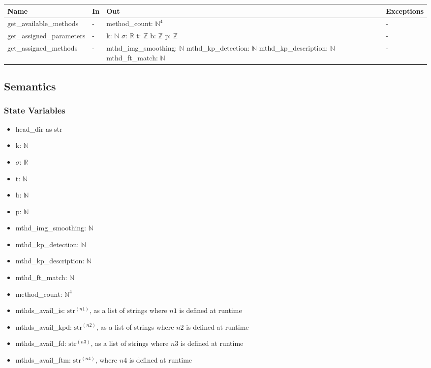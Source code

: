 \documentclass[12pt, titlepage]{article}
\begin{document}
\begin{center}
\begin{tabular}{p{4cm} p{3.5cm} p{4.5cm} p{3.5cm}}
\hline
\textbf{Name} & \textbf{In} & \textbf{Out} & \textbf{Exceptions} \\
\hline
get\_available\_methods & - & 
method\_count: $\mathbb{N}^4$
& - \\
\hline


get\_assigned\_parameters & - & 
k: $\mathbb{N}$ \newline 
$\sigma$: $\mathbb{R}$ \newline 
t: $\mathbb{Z}$ \newline 
b: $\mathbb{Z}$ \newline 
p: $\mathbb{Z}$ 
& - \\
\hline
\begin{comment}

\end{comment}
get\_assigned\_methods & - & 
mthd\_img\_smoothing: $\mathbb{N}$ \newline 
mthd\_kp\_detection: $\mathbb{N}$ \newline 
mthd\_kp\_description: $\mathbb{N}$ \newline 
mthd\_ft\_match: $\mathbb{N}$ & - \\
\hline
\end{tabular}
\end{center}

\subsection{Semantics}

\subsubsection{State Variables}
\begin{itemize}
  \item head\_dir as str
  \item k: $\mathbb{N}$
  \item $\sigma$: $\mathbb{R}$
  \item t: $\mathbb{N}$
  \item b: $\mathbb{N}$
  \item p: $\mathbb{N}$
  \item mthd\_img\_smoothing: $\mathbb{N}$
  \item mthd\_kp\_detection: $\mathbb{N}$
  \item mthd\_kp\_description: $\mathbb{N}$
  \item mthd\_ft\_match: $\mathbb{N}$
  \item method\_count: $\mathbb{N}^4$
  \item mthds\_avail\_is: $\textrm{str}^{(n1)}$, as a list of strings where ${n1}$ is defined at runtime
  \item mthds\_avail\_kpd: $\textrm{str}^{(n2)}$, as a list of strings where ${n2}$ is defined at runtime
  \item mthds\_avail\_fd: $\textrm{str}^{(n3)}$, as a list of strings where ${n3}$ is defined at runtime
  \item mthds\_avail\_ftm: $\textrm{str}^{(n4)}$, where ${n4}$ is defined at runtime
\end{itemize}
\end{document}
